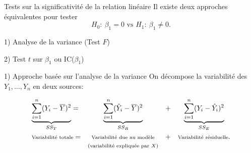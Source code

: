 \documentclass{BeamerTemplate}
\begin{document}
\begin{frame}[t]{Tests sur la significativité de la relation linéaire}
Il existe deux approches équivalentes pour tester
$$
H_0:~\beta_1=0\text{\ \ \ \ vs\ \ \ \ }H_1:~\beta_1\neq0.
$$



\begin{Boite}{}{1) Analyse de la variance
 (Test $F$)}
 \end{Boite}



\begin{Boite}{}{2) Test $t$ sur $\beta_1$
 ou IC($\beta_1$)}
 \end{Boite}

\end{frame}

\begin{frame}[t]{1) Approche basée sur l'analyse de la variance}
On décompose la variabilité des $Y_1,\ldots,Y_n$ en deux sources:

$$\begin{array}{lccc}
\underbrace{\sum_{i=1}^n(Y_{i}-\overline{Y})^2}_{SS_T}=&
\underbrace{\sum_{i=1}^n(\hat{Y}_i-\overline{Y})^2}_{SS_{R}}&+&
\underbrace{\sum_{i=1}^n(Y_{i}-\hat{Y}_{i})^2}_{SS_E}\\[1cm]
\mbox{{\scriptsize Variabilité totale}} =&
\mbox{{\scriptsize Variabilité due au modèle}}& +&
\mbox{{\scriptsize Variabilité résiduelle}}.\\
 &
\mbox{{\scriptsize (variabilité expliquée par $X$)}}
\end{array}$$

\end{frame}
\end{document}

